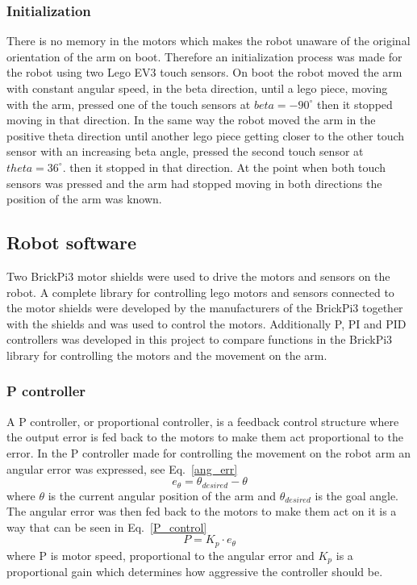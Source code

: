 \subsubsection{Initialization}
\label{sec:simon6}
There is no memory in the motors which makes the robot unaware of the original orientation of the arm on boot. Therefore an initialization process was made for the robot using two Lego EV3 touch sensors. On boot the robot moved the arm with constant angular speed, in the beta direction, until a lego piece, moving with the arm, pressed one of the touch sensors at \(beta = -90^{\circ}\) then it stopped moving in that direction. In the same way the robot moved the arm in the positive theta direction until another lego piece getting closer to the other touch sensor with an increasing beta angle, pressed the second touch sensor at \(theta = 36^{\circ}\). then it stopped in that direction. At the point when both touch sensors was pressed and the arm had stopped moving in both directions the position of the arm was known.
\subsection{Robot software}
\label{sec:simon19}
Two BrickPi3 motor shields were used to drive the motors and sensors on the robot. A complete library for controlling lego motors and sensors connected to the motor shields were developed by the manufacturers of the BrickPi3 together with the shields and was used to control the motors. Additionally P, PI and PID controllers was developed in this project to compare functions in the BrickPi3 library for controlling the motors and the movement on the arm.
\subsubsection{P controller}
\label{sec:simon7}
A P controller, or proportional controller, is a feedback control structure where the output error is fed back to the motors to make them act proportional to the error. In the P controller made for controlling the movement on the robot arm an angular error was expressed, see Eq.~\eqref{ang_err}
\begin{equation}
    e_{\theta} = \theta_{desired} - \theta
    \label{ang_err}
\end{equation}
where \(\theta\) is the current angular position of the arm and \(\theta_{desired}\) is the goal angle. The angular error was then fed back to the motors to make them act on it is a way that can be seen in Eq.~\eqref{P_control}
\begin{equation}
    P = K_p\cdot e_{\theta}
    \label{P_control}
\end{equation}
where P is motor speed, proportional to the angular error and \(K_p\) is a proportional gain which determines how aggressive the controller should be.

